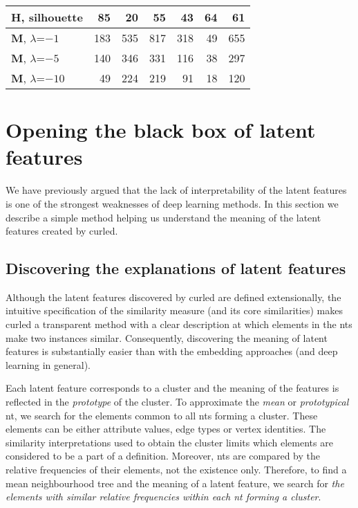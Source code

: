 \begin{table}[t]
{\begin{tabular}[t]{@{}lrrrrrr@{}}
    \textbf{H}, silhouette  		& 85           & 20  	 & 55  		& 43   		& 64  & 61 \\
	\midrule
	\textbf{M}, $\lambda$=$-1$ 		& 183          & 535     & 817		& 318  		& 49   &  655	   \\

	\textbf{M}, $\lambda$=$-5$ 		& 140          & 346   	 & 331		& 116    	& 38   & 297	   \\

	\textbf{M}, $\lambda$=$-10$		& 49          & 224 	 & 219		& 91  		& 18   & 120	   \\
	\bottomrule

\end{tabular}
}

\label{tab:Size}

\end{table}



\section{Opening the black box of latent features}

We have previously argued that the lack of interpretability of the latent features is one of the strongest weaknesses of deep learning methods.
In this section we describe a simple method helping us understand the meaning of the latent features created by \gls{curled}.






\subsection{Discovering the explanations of latent features}

Although the latent features discovered by \gls{curled} are defined extensionally, the intuitive specification of the similarity measure (and its core similarities) makes \gls{curled} a transparent method with a clear description at which elements in the \gls{nt}s make two instances similar.
Consequently, discovering the meaning of latent features is substantially easier than with the embedding approaches (and deep learning in general).

Each latent feature corresponds to a cluster and the meaning of the features is reflected in the \textit{prototype} of the cluster.
To approximate the \textit{mean} or \textit{prototypical} \gls{nt}, we search for the elements common to all \gls{nt}s forming a cluster.
These elements can be either attribute values, edge types or vertex identities.
The similarity interpretations used to obtain the cluster limits which elements are considered to be a part of a definition.
Moreover, \gls{nt}s are compared by the relative frequencies of their elements, not the existence only.
Therefore, to find a mean neighbourhood tree and the meaning of a latent feature, we search for \textit{the elements with similar relative frequencies within each \gls{nt} forming a cluster}.



